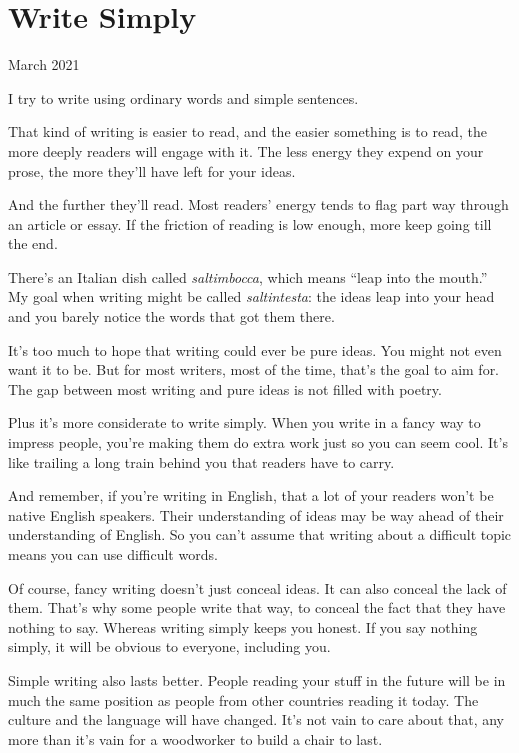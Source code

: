 \chapter{Write Simply}

March 2021

I try to write using ordinary words and simple sentences.

That kind of writing is easier to read, and the easier something is to
read, the more deeply readers will engage with it. The less energy they
expend on your prose, the more they'll have left for your ideas.

And the further they'll read. Most readers' energy tends to flag part
way through an article or essay. If the friction of reading is low
enough, more keep going till the end.

There's an Italian dish called \emph{saltimbocca}, which means ``leap
into the mouth.'' My goal when writing might be called
\emph{saltintesta}: the ideas leap into your head and you barely notice
the words that got them there.

It's too much to hope that writing could ever be pure ideas. You might
not even want it to be. But for most writers, most of the time, that's
the goal to aim for. The gap between most writing and pure ideas is not
filled with poetry.

Plus it's more considerate to write simply. When you write in a fancy
way to impress people, you're making them do extra work just so you can
seem cool. It's like trailing a long train behind you that readers have
to carry.

And remember, if you're writing in English, that a lot of your readers
won't be native English speakers. Their understanding of ideas may be
way ahead of their understanding of English. So you can't assume that
writing about a difficult topic means you can use difficult words.

Of course, fancy writing doesn't just conceal ideas. It can also conceal
the lack of them. That's why some people write that way, to conceal the
fact that they have
\href{https://scholar.google.com/scholar?hl=en&as_sdt=0\%2C5&q=hermeneutic+dialectics+hegemonic+modalities}{}nothing
to say. Whereas writing simply keeps you honest. If you say nothing
simply, it will be obvious to everyone, including you.

Simple writing also lasts better. People reading your stuff in the
future will be in much the same position as people from other countries
reading it today. The culture and the language will have changed. It's
not vain to care about that, any more than it's vain for a woodworker to
build a chair to last.

